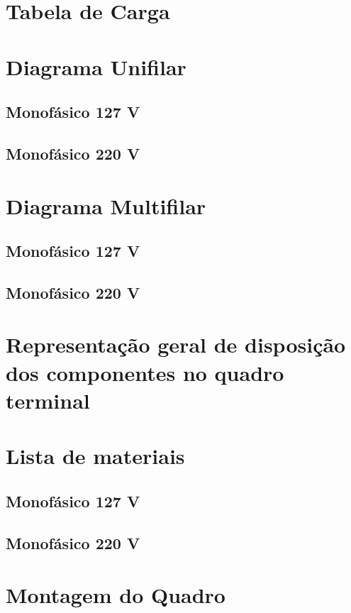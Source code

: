 
\section{Tabela de Carga}







\section{Diagrama Unifilar}
\subsection{Monofásico 127 V}
\subsection{Monofásico 220 V}

\section{Diagrama Multifilar}
\subsection{Monofásico 127 V}
\subsection{Monofásico 220 V}

\section{Representação geral de disposição dos componentes no quadro terminal}

\section{Lista de materiais}
\subsection{Monofásico 127 V}
\subsection{Monofásico 220 V}

\section{Montagem do Quadro}

